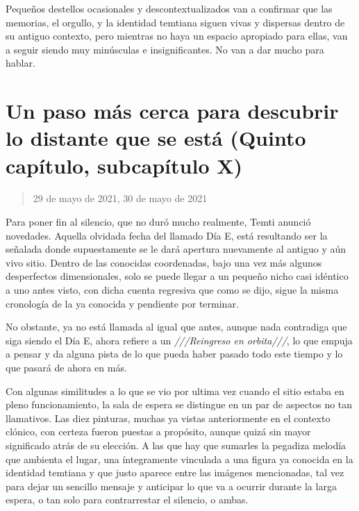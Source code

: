 \documentclass[
  spanish,
]{book}
\begin{document}
Pequeños destellos ocasionales y descontextualizados van a confirmar que las memorias, el orgullo, y la identidad temtiana siguen vivas y dispersas dentro de su antiguo contexto, pero mientras no haya un espacio apropiado para ellas, van a seguir siendo muy minúsculas e insignificantes. No van a dar mucho para hablar.

\hypertarget{un-paso-muxe1s-cerca-para-descubrir-lo-distante-que-se-estuxe1-quinto-capuxedtulo-subcapuxedtulo-x}{%
\section{Un paso más cerca para descubrir lo distante que se está (Quinto capítulo, subcapítulo X)}\label{un-paso-muxe1s-cerca-para-descubrir-lo-distante-que-se-estuxe1-quinto-capuxedtulo-subcapuxedtulo-x}}

\begin{quote}
29 de mayo de 2021, 30 de mayo de 2021
\end{quote}

Para poner fin al silencio, que no duró mucho realmente, Temti anunció novedades. Aquella olvidada fecha del llamado Día E, está resultando ser la señalada donde supuestamente se le dará apertura nuevamente al antiguo y aún vivo sitio. Dentro de las conocidas coordenadas, bajo una vez más algunos desperfectos dimensionales, solo se puede llegar a un pequeño nicho casi idéntico a uno antes visto, con dicha cuenta regresiva que como se dijo, sigue la misma cronología de la ya conocida y pendiente por terminar.

No obstante, ya no está llamada al igual que antes, aunque nada contradiga que siga siendo el Día E, ahora refiere a un \emph{///Reingreso en orbita///}, lo que empuja a pensar y da alguna pista de lo que pueda haber pasado todo este tiempo y lo que pasará de ahora en más.

Con algunas similitudes a lo que se vio por ultima vez cuando el sitio estaba en pleno funcionamiento, la sala de espera se distingue en un par de aspectos no tan llamativos. Las diez pinturas, muchas ya vistas anteriormente en el contexto clónico, con certeza fueron puestas a propósito, aunque quizá sin mayor significado atrás de su elección. A las que hay que sumarles la pegadiza melodía que ambienta el lugar, una íntegramente vinculada a una figura ya conocida en la identidad temtiana y que justo aparece entre las imágenes mencionadas, tal vez para dejar un sencillo mensaje y anticipar lo que va a ocurrir durante la larga espera, o tan solo para contrarrestar el silencio, o ambas.
\end{document}
